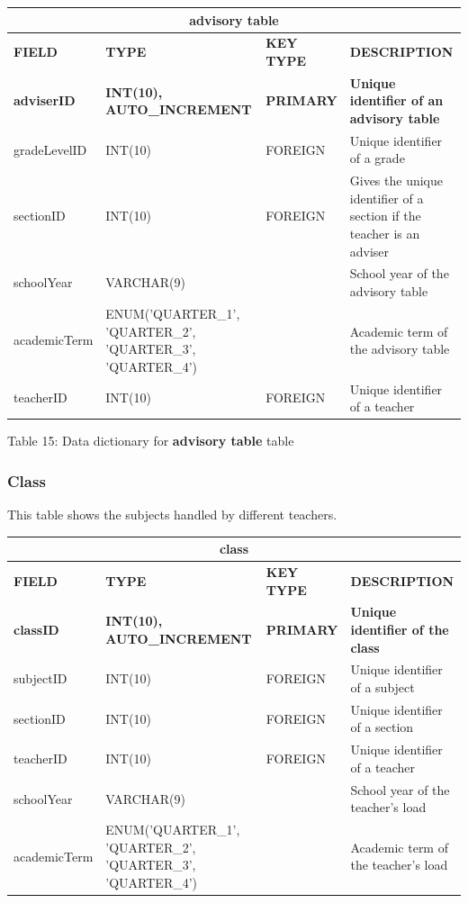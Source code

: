 \documentclass[11pt,a4paper,titlepage]{article}
\begin{document}
\vspace{.5cm}
\begin{longtable}{ |p{2.5cm}|p{4.5cm}|p{2.5cm}|p{3cm}|  }
    \hline
    \multicolumn{4}{|c|}{\textbf{advisory table}} \\
    \hline
    \textbf{FIELD}&\textbf{TYPE}&\textbf{KEY TYPE}&\textbf{DESCRIPTION}\\
    \hline
    \textbf{adviserID}  & \textbf{INT(10), AUTO\_INCREMENT} & \textbf{PRIMARY} & \textbf{Unique identifier of an advisory table}\\ \hline
    gradeLevelID   & INT(10) & FOREIGN & Unique identifier of a grade   \\ \hline
    sectionID   & INT(10)   & FOREIGN & Gives the unique identifier of a section if the teacher is an adviser\\ \hline
    schoolYear   & VARCHAR(9)   & & School year of the advisory table\\ \hline
    academicTerm   & ENUM('QUARTER\_1', 'QUARTER\_2', 'QUARTER\_3', 'QUARTER\_4')   & & Academic term of the advisory table\\ \hline
    teacherID & INT(10) & FOREIGN & Unique identifier of a teacher\\ \hline
\end{longtable}

\vspace{.5cm}
\begin{center}
    Table 15: Data dictionary for \textbf{advisory table} table
\end{center}


\subsubsection{Class}

This table shows the subjects handled by different teachers.

\vspace{1cm}
\begin{longtable}{ |p{2.5cm}|p{4.5cm}|p{2.5cm}|p{3cm}|  }
    \hline
    \multicolumn{4}{|c|}{\textbf{class}} \\
    \hline
    \textbf{FIELD}&\textbf{TYPE}&\textbf{KEY TYPE}&\textbf{DESCRIPTION}\\
    \hline
    \textbf{classID}  & \textbf{INT(10), AUTO\_INCREMENT} & \textbf{PRIMARY} & \textbf{Unique identifier of the class}\\ \hline
    subjectID   & INT(10) & FOREIGN & Unique identifier of a subject\\ \hline
    sectionID   & INT(10) & FOREIGN & Unique identifier of a section\\ \hline
    teacherID   & INT(10) & FOREIGN & Unique identifier of a teacher\\ \hline
    schoolYear   & VARCHAR(9)   & & School year of the teacher's load\\ \hline
    academicTerm   & ENUM('QUARTER\_1', 'QUARTER\_2', 'QUARTER\_3', 'QUARTER\_4')   & & Academic term of the teacher's load\\ \hline
\end{longtable}
\end{document}
